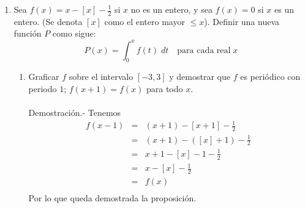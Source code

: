 \begin{enumerate}[\bfseries  1.]
    \item Sea $f(x)=x-[x]-\frac{1}{2}$ si $x$ no es un entero, y sea $f(x)=0$ si $x$ es un entero. (Se denota $[x]$ como el entero mayor $\leq x$). Definir una nueva función $P$ como sigue:
	$$P(x)=\int_0^x f(t)\; dt\quad \mbox{para cada real}\; x$$

	\begin{enumerate}[\bfseries (a)]

	    \item Graficar $f$ sobre el intervalo $[-3,3]$ y demostrar que $f$ es periódico con periodo $1$; $f(x+1)=f(x)$ para todo $x$.\\\\
		Demostración.-\; Tenemos 
		$$\begin{array}{rcl}
		    f(x-1)&=&(x+1)-[x+1]-\frac{1}{2}\\
			  &=&(x+1)-([x]+1)-\frac{1}{2}\\
			  &=&x+1-[x]-1-\frac{1}{2}\\
			  &=&x-[x]-\frac{1}{2}\\
			  &=&f(x)\\
		\end{array}$$
		Por lo que queda demostrada la proposición.\\\\


\end{enumerate}
\end{enumerate}
